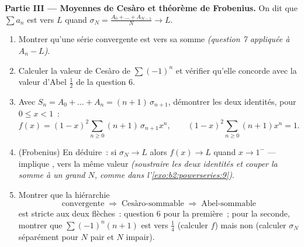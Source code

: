 \begin{problem}
\medskip
\noindent\textbf{Partie III --- Moyennes de Cesàro et théorème de
Frobenius.} On dit que $\sum a_n$ est \emph{} vers $L$ quand
$\sigma_N = \frac{A_0 + \dots + A_{N-1}}{N} \to L$.
\begin{enumerate}[resume]
  \item Montrer qu'une série convergente est  vers
        sa somme \emph{(question 7 appliquée à $A_n - L$)}.
  \item Calculer la valeur de Cesàro de $\sum(-1)^n$ et vérifier qu'elle
        concorde avec la valeur d'Abel $\frac12$ de la question 6.
  \item Avec $S_n = A_0 + \dots + A_n = (n+1)\,\sigma_{n+1}$,
        démontrer les deux identités, pour $0 \leq x < 1$~:
        \[
        f(x) = (1-x)^2\sum_{n\geq0}(n+1)\,\sigma_{n+1}x^n,
        \qquad
        (1-x)^2\sum_{n\geq0}(n+1)x^n = 1 .
        \]
  \item (Frobenius) En déduire~: si $\sigma_N \to L$ alors $f(x) \to
        L$ quand $x \to 1^-$ ---  implique
        , vers la même valeur \emph{(soustraire les deux
        identités et couper la somme à un grand $N$, comme dans
        l'\cref{exo:b2:powerseries:9})}.
  \item Montrer que la hiérarchie
        \[
        \text{convergente} \;\Longrightarrow\;
        \text{Cesàro-sommable} \;\Longrightarrow\;
        \text{Abel-sommable}
        \]
        est stricte aux deux flèches~: question 6 pour la première~;
        pour la seconde, montrer que $\sum(-1)^n(n+1)$ est
         vers $\frac14$ (calculer $f$) mais non
         (calculer $\sigma_N$ séparément pour
        $N$ pair et $N$ impair).
\end{enumerate}


\end{problem}
